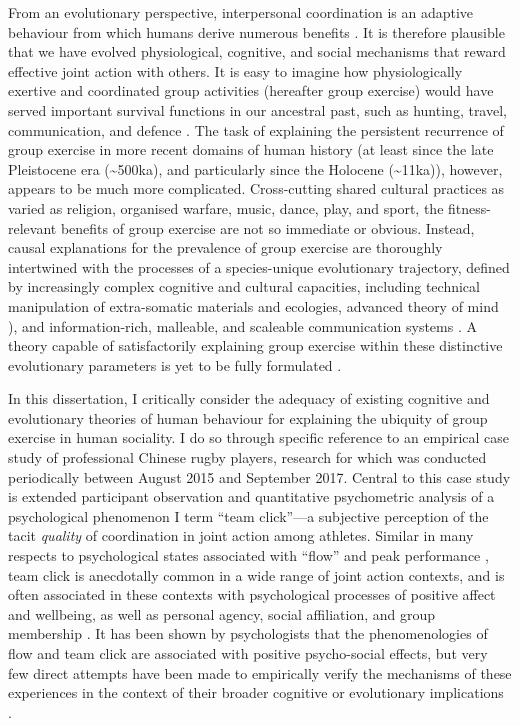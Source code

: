 From an evolutionary perspective, interpersonal coordination is an adaptive behaviour from which humans derive numerous benefits \citep{Tomasello2014}. It is therefore plausible that we have evolved physiological, cognitive, and social mechanisms that reward effective joint action with others.  It is easy to imagine how physiologically exertive and coordinated group activities (hereafter group exercise) would have served important survival functions in our ancestral past, such as hunting, travel, communication, and defence \citep{Sands2010}.  The task of explaining the persistent recurrence of group exercise in more recent domains of human history (at least since the late Pleistocene era (\sim500ka), and particularly since the Holocene (\sim11ka)), however, appears to be much more complicated.  Cross-cutting shared cultural practices as varied as religion, organised warfare, music, dance, play, and sport, the fitness-relevant benefits of group exercise are not so immediate or obvious.  Instead, causal explanations for the prevalence of group exercise are thoroughly intertwined with the processes of a species-unique evolutionary trajectory, defined by increasingly complex cognitive and cultural capacities, including technical manipulation of extra-somatic materials and ecologies, advanced theory of mind \citep{Tomasello1999}), and information-rich, malleable, and scaleable communication systems \citep{Fuentes2016}.  A theory capable of satisfactorily explaining group exercise within these distinctive evolutionary parameters is yet to be fully formulated \citep{Cohen2017}.

In this dissertation, I critically consider the adequacy of existing cognitive and evolutionary theories of human behaviour for explaining the ubiquity of group exercise in human sociality.  I do so through specific reference to an empirical case study of professional Chinese rugby players, research for which was conducted periodically between August 2015 and September 2017.  Central to this case study is extended participant observation and quantitative psychometric analysis of a psychological phenomenon I term ``team click''---a subjective perception  of the tacit \textit{quality} of coordination in joint action among athletes.  Similar in many respects to psychological states associated with ``flow'' and peak performance \citep{Csikszentmihalyi1992}, team click is anecdotally common in a wide range of joint action contexts, and is often associated in these contexts with psychological processes of positive affect and wellbeing, as well as personal agency, social affiliation, and group membership \citep{Jackson1995,Marsh2009, Wheatley2012}.  It has been shown by psychologists that the phenomenologies of flow and team click are associated with positive psycho-social effects, but very few direct attempts have been made to empirically verify the mechanisms of these experiences in the context of their broader cognitive or evolutionary implications \citep[but, for (neuro)cognitive see][]{Dietrich2004,Dietrich2011}\citep[and for an evolutionary framing of flow, see see][]{Slingerland2014,Haidt2007}.

